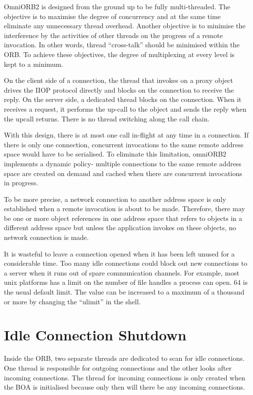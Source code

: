 \documentclass[11pt,twoside,onecolumn]{book}
\begin{document}
OmniORB2 is designed from the ground up to be fully multi-threaded. The
objective is to maximise the degree of concurrency and at the same time
eliminate any unnecessary thread overhead. Another objective is to minimise
the interference by the activities of other threads on the progress of a
remote invocation. In other words, thread ``cross-talk'' should be
minimised within the ORB. To achieve these objectives, the degree of
multiplexing at every level is kept to a minimum.

On the client side of a connection, the thread that invokes on a proxy
object drives the IIOP protocol directly and blocks on the connection to
receive the reply. On the server side, a dedicated thread blocks on the
connection. When it receives a request, it performs the up-call to the
object and sends the reply when the upcall returns. There
is no thread switching along the call chain.

With this design, there is at most one call in-flight at any time in a
connection. If there is only one connection, concurrent invocations to the
same remote address space would have to be serialised. To eliminate this
limitation, omniORB2 implements a dynamic policy- multiple connections to
the same remote address space are created on demand and cached when there
are concurrent invocations in progress.

To be more precise, a network connection to another address space is only
established when a remote invocation is about to be made. Therefore, there
may be one or more object references in one address space that refers to
objects in a different address space but unless the application invokes on
these objects, no network connection is made.

It is wasteful to leave a connection opened when it has been left unused
for a considerable time. Too many idle connections could block out new
connections to a server when it runs out of spare communication
channels. For example, most unix platforms has a limit on the number of
file handles a process can open. 64 is the usual default limit. The
value can be increased to a maximum of a thousand or more by changing the
``ulimit'' in the shell.

\section{Idle Connection Shutdown}
\label{sec_shut}

Inside the ORB, two separate threads are dedicated to scan for idle
connections. One thread is responsible for outgoing connections and the
other looks after incoming connections. The thread for incoming connections
is only created when the BOA is initialised because only then will there be
any incoming connections.
\end{document}
